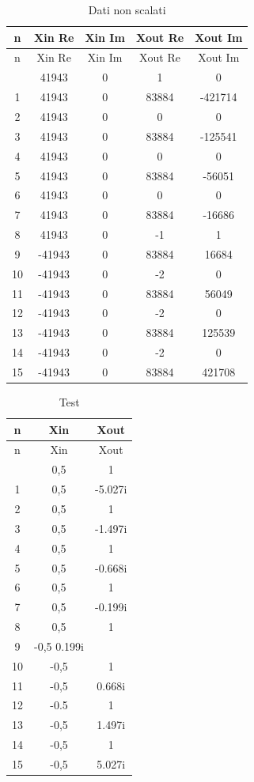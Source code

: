 \documentclass[a4paper, titlepage]{article}
\begin{document}
\begin{longtable}{*5c}
\caption{Dati non scalati}
\label{}\\
\toprule
n & Xin Re & Xin Im & Xout Re & Xout Im \\
\midrule
\endfirsthead
n & Xin Re & Xin Im & Xout Re & Xout Im \\
\midrule
\endhead
\midrule
\endfoot
\bottomrule
\endlastfoot
0 & 41943 & 0 & 1 & 0\\
1 & 41943    & 0 & 83884 & -421714 \\
2 & 41943    & 0 & 0 & 0 \\
3 & 41943    & 0 & 83884 & -125541 \\
4 & 41943    & 0 & 0 & 0 \\
5 & 41943    & 0 & 83884 & -56051 \\
6 & 41943    & 0 & 0 & 0 \\
7 & 41943    & 0 & 83884 & -16686 \\
8 & 41943    & 0 & -1 & 1 \\
9 & -41943    & 0 & 83884 & 16684 \\
10& -41943    & 0 & -2 & 0 \\
11& -41943    & 0 & 83884 & 56049 \\
12& -41943    & 0 & -2 & 0 \\
13& -41943    & 0 & 83884 & 125539 \\
14& -41943    & 0 & -2 & 0 \\
15 & -41943 & 0 & 83884 & 421708 \\ 
\end{longtable}
\newpage
\begin{longtable}{*3c}
\caption{Test}
\label{}\\
\toprule
n    & Xin & Xout\\
\midrule
\endfirsthead
n & Xin & Xout\\
\midrule
\endhead
\midrule
\endfoot
\bottomrule
\endlastfoot
0 & 0,5& 1\\
1 & 0,5& -5.027i\\
2 & 0,5& 1\\
3 & 0,5& -1.497i\\
4 & 0,5& 1\\
5 & 0,5& -0.668i\\
6 & 0,5& 1\\
7 & 0,5& -0.199i \\
8 & 0,5& 1 \\
9 & -0,5 0.199i\\
10& -0,5& 1\\
11& -0,5& 0.668i\\
12& -0.5& 1\\
13& -0,5& 1.497i\\
14& -0,5& 1\\
15 &-0,5& 5.027i\\ 
\end{longtable}
\end{document}
